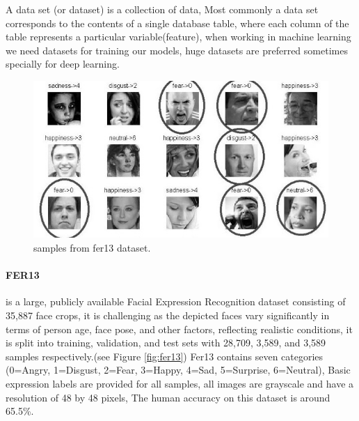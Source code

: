 A data set (or dataset) is a collection of data, Most commonly a data set corresponds to the contents of a single database table, where each column of the table represents a particular variable(feature), when working in machine learning we need datasets for training our models, huge datasets are preferred sometimes specially for deep learning.

\begin{figure}
	\centering
	\includegraphics[width=.7\textwidth]{images/fer2013.jpg}
	\caption{samples from fer13 dataset.}
\end{figure}
\paragraph{FER13} is a large, publicly available Facial Expression Recognition dataset consisting of 35,887 face crops, it is challenging as the depicted faces vary significantly in terms of person age, face pose, and other factors, reflecting realistic conditions, 
it is split into training, validation, and test sets with 28,709, 3,589, and 3,589 samples respectively.(see Figure \ref{fig:fer13})\newline
Fer13 contains seven categories (0=Angry, 1=Disgust, 2=Fear, 3=Happy, 4=Sad, 5=Surprise, 6=Neutral), Basic expression labels are provided for all samples, all images are grayscale and have a resolution of 48 by 48 pixels, The human accuracy on this dataset is around 65.5\%. \newline
 
